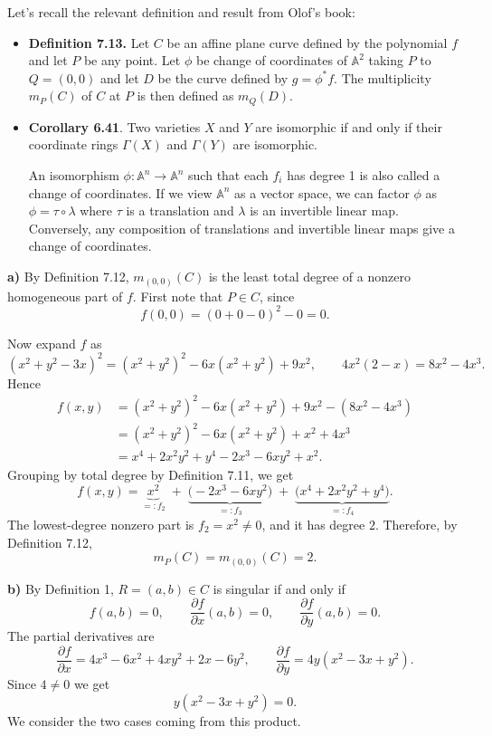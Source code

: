\documentclass[a4paper,12pt,openany]{article}
\theoremstyle{plain}
\theoremstyle{definition}
\theoremstyle{remark}
\begin{document}
Let's recall the relevant definition and result from Olof's book:
\begin{itemize}
\item \textbf{Definition 7.13.} Let $C$ be an affine plane curve defined by the polynomial $f$ and let $P$ be any point. Let $\phi$ be change of coordinates of $\mathbb{A}^2$ taking $P$ to $Q=(0,0)$ and let $D$ be the curve defined by $g=\phi^* f$. The multiplicity $m_P(C)$ of $C$ at $P$ is then defined as $m_Q(D)$.

\item \textbf{Corollary 6.41}. Two varieties $X$ and $Y$ are isomorphic if and only if their coordinate rings $\Gamma(X)$ and $\Gamma(Y)$ are isomorphic.

An isomorphism $\phi: \mathbb{A}^n \rightarrow \mathbb{A}^n$ such that each $f_i$ has degree 1 is also called a change of coordinates. If we view $\mathbb{A}^n$ as a vector space, we can factor $\phi$ as $\phi=\tau \circ \lambda$ where $\tau$ is a translation and $\lambda$ is an invertible linear map. Conversely, any composition of translations and invertible linear maps give a change of coordinates.
\end{itemize}

\medskip


\textbf{a)} By Definition 7.12, $m_{(0,0)}(C)$ is the least total degree of a nonzero homogeneous part of $f$. First note that $P\in C$, since
\[
f(0,0)=(0+0-0)^{2}-0=0.
\]

Now expand $f$ as
\[
(x^{2}+y^{2}-3x)^{2}=(x^{2}+y^{2})^{2}-6x(x^{2}+y^{2})+9x^{2},
\qquad
4x^{2}(2-x)=8x^{2}-4x^{3}.
\]
Hence
\begin{align*}
f(x,y)
&=(x^{2}+y^{2})^{2}-6x(x^{2}+y^{2})+9x^{2}-(8x^{2}-4x^{3})\\
&=(x^{2}+y^{2})^{2}-6x(x^{2}+y^{2})+x^{2}+4x^{3}\\
&=x^{4}+2x^{2}y^{2}+y^{4}-2x^{3}-6xy^{2}+x^{2}.
\end{align*}
Grouping by total degree by Definition 7.11, we get
\[
f(x,y)=\underbrace{x^{2}}_{=:f_{2}}
\;+\;
\underbrace{\bigl(-2x^{3}-6xy^{2}\bigr)}_{=:f_{3}}
\;+\;
\underbrace{\bigl(x^{4}+2x^{2}y^{2}+y^{4}\bigr)}_{=:f_{4}}.
\]
The lowest-degree nonzero part is $f_{2}=x^{2}\neq 0$, and it has degree $2$. Therefore, by Definition 7.12,
\[
m_{P}(C)=m_{(0,0)}(C)=2.
\]


\medskip

\textbf{b)} 
By Definition 1, $R=(a,b)\in C$ is singular if and only if
\[
f(a,b)=0,\qquad \frac{\partial f}{\partial x}(a,b)=0,\qquad \frac{\partial f}{\partial y}(a,b)=0.
\]
The partial derivatives are
\[
\frac{\partial f}{\partial x}
=4x^{3}-6x^{2}+4xy^{2}+2x-6y^{2},
\qquad
\frac{\partial f}{\partial y}
=4y(x^{2}-3x+y^{2}).
\]
Since $4\neq 0$ we get
\[
y(x^{2}-3x+y^{2})=0.
\]
We consider the two cases coming from this product.
\end{document}
